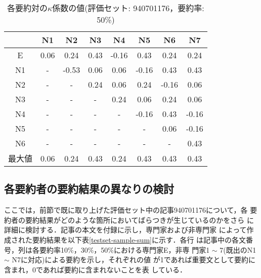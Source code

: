 \begin{table*}
\begin{center}
\caption{各要約対の$\kappa$係数の値(評価セット: 940701176，要約率: 50\%)}
{\small
\begin{tabular}{|c||c|c|c|c|c|c|c|} \hline
       & N1 & N2 & N3 & N4 & N5 & N6 & N7 \\ \hline\hline
E&0.06&0.24&0.43&-0.16&0.43&0.24&0.24\\ \hline
N1&-&-0.53&0.06&0.06&-0.16&0.43&0.43\\ \hline
N2&-&-&0.24&0.06&0.24&-0.16&0.06\\ \hline
N3&-&-&-&0.24&0.06&0.24&0.06\\ \hline
N4&-&-&-&-&-0.16&0.43&-0.16\\ \hline
N5&-&-&-&-&-&0.06&-0.16\\ \hline
N6&-&-&-&-&-&-&0.43\\ \hline\hline
最大値 & 0.06 & 0.24 & 0.43 & 0.24 & 0.43 & 0.43 & 0.43 \\ \hline
\end{tabular}
}
\label{matrix-kappa-05}
\end{center}
\end{table*}


\subsection{各要約者の要約結果の異なりの検討}

ここでは，前節で既に取り上げた評価セット中の記事940701176について，各
要約者の要約結果がどのような箇所においてばらつきが生じているのかをさら
に詳細に検討する．記事の本文を付録に示し，専門家および非専門家
によって作成された要約結果を以下表\ref{testset-sample-sum}に示す．各行
は記事中の各文番号，列は各要約率10\%，30\%，50\%における専門家E，非専
門家1 $\sim$ 7(既出のN1 $\sim$ N7に対応)による要約を示し，それぞれの値
が1であれば重要文として要約に含まれ，0であれば要約に含まれないことを表
している．


